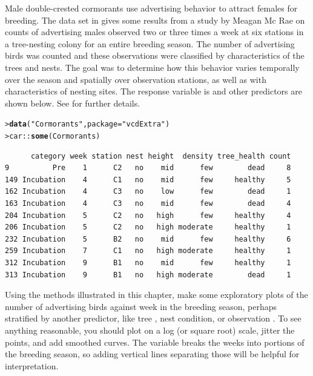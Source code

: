 \documentclass[10pt]{report}\usepackage[]{graphicx}\usepackage[]{color}
\makeatletter
\newcommand{\hlstr}[1]{\textcolor[rgb]{0.192,0.494,0.8}{#1}}%
\newcommand{\hlopt}[1]{\textcolor[rgb]{0,0,0}{#1}}%
\newcommand{\hlstd}[1]{\textcolor[rgb]{0.345,0.345,0.345}{#1}}%
\newcommand{\hlkwc}[1]{\textcolor[rgb]{0.333,0.667,0.333}{#1}}%
\newcommand{\hlkwd}[1]{\textcolor[rgb]{0.737,0.353,0.396}{\textbf{#1}}}%
\newenvironment{kframe}{%
 \def\at@end@of@kframe{}%
 \ifinner\ifhmode%
  \def\at@end@of@kframe{\end{minipage}}%
  \begin{minipage}{\columnwidth}%
 \fi\fi%
 \def\FrameCommand##1{\hskip\@totalleftmargin \hskip-\fboxsep
 \colorbox{shadecolor}{##1}\hskip-\fboxsep
     \hskip-\linewidth \hskip-\@totalleftmargin \hskip\columnwidth}%
 \MakeFramed {\advance\hsize-\width
   \@totalleftmargin\z@ \linewidth\hsize
   \@setminipage}}%
 {\par\unskip\endMakeFramed%
 \at@end@of@kframe}
\newenvironment{knitrout}{}{} %
\renewenvironment{knitrout}{\small\renewcommand{\baselinestretch}{.85}}{} %
\makeatother
\begin{document}
\begin{Exercises}
  \exercise Male double-crested cormorants use advertising behavior to attract females for breeding.
	The  data set in  gives some results from a study by
	Meagan Mc Rae \citeyearpar{McRae:2015} on counts of advertising males observed two or three times a week
	at six stations in a tree-nesting colony for an entire breeding season.
	The number of advertising birds was counted and these observations were classified
	by characteristics of the trees and nests. The goal was to determine how this behavior varies 
	temporally over the season and spatially over observation stations, as well as with 
	characteristics of nesting sites.
	The response variable is 
	and other predictors are shown below.  See 
	for further details.
\begin{knitrout}\footnotesize
{}\color{fgcolor}\begin{kframe}
\begin{alltt}
\hlstd{> }\hlkwd{data}\hlstd{(}\hlstr{"Cormorants"}\hlstd{,} \hlkwc{package} \hlstd{=} \hlstr{"vcdExtra"}\hlstd{)}
\hlstd{> }\hlstd{car}\hlopt{::}\hlkwd{some}\hlstd{(Cormorants)}
\end{alltt}
\begin{verbatim}
      category week station nest height  density tree_health count
9          Pre    1      C2   no    mid      few        dead     8
149 Incubation    4      C1   no    mid      few     healthy     5
162 Incubation    4      C3   no    low      few        dead     1
163 Incubation    4      C3   no    mid      few        dead     4
204 Incubation    5      C2   no   high      few     healthy     4
206 Incubation    5      C2   no   high moderate     healthy     1
232 Incubation    5      B2   no    mid      few     healthy     6
259 Incubation    7      C1   no   high moderate     healthy     1
312 Incubation    9      B1   no    mid      few     healthy     1
313 Incubation    9      B1   no   high moderate        dead     1
\end{verbatim}
\end{kframe}
\end{knitrout}
	\begin{enumerate*}
		\item Using the methods illustrated in this chapter, make some exploratory plots of the
		number of advertising birds against week in the breeding season, perhaps stratified
		by another predictor, like tree , nest condition, or observation
		. 
		To see anything reasonable,
		you should plot  on a log (or square root) scale, jitter the points, and add
		smoothed curves. The variable  breaks the weeks into portions of the
		breeding season, so adding vertical lines separating those will be helpful for interpretation.
		\begin{ans}
		\end{ans}
		

\end{enumerate*}
\end{Exercises}
\end{document}
